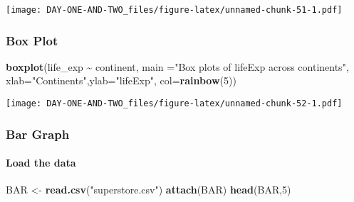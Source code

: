 \documentclass[
]{article}
\newenvironment{Shaded}{\begin{snugshade}}{\end{snugshade}}
\newcommand{\AttributeTok}[1]{\textcolor[rgb]{0.13,0.29,0.53}{#1}}
\newcommand{\DecValTok}[1]{\textcolor[rgb]{0.00,0.00,0.81}{#1}}
\newcommand{\FunctionTok}[1]{\textcolor[rgb]{0.13,0.29,0.53}{\textbf{#1}}}
\newcommand{\NormalTok}[1]{#1}
\newcommand{\OtherTok}[1]{\textcolor[rgb]{0.56,0.35,0.01}{#1}}
\newcommand{\SpecialCharTok}[1]{\textcolor[rgb]{0.81,0.36,0.00}{\textbf{#1}}}
\newcommand{\StringTok}[1]{\textcolor[rgb]{0.31,0.60,0.02}{#1}}
\begin{document}
\texttt{[image: DAY-ONE-AND-TWO\_files/figure-latex/unnamed-chunk-51-1.pdf]}

\hypertarget{box-plot}{%
\subsubsection{Box Plot}\label{box-plot}}

\begin{Shaded}
\begin{Highlighting}[]
\FunctionTok{boxplot}\NormalTok{(life\_exp }\SpecialCharTok{\textasciitilde{}}\NormalTok{ continent, }\AttributeTok{main =}\StringTok{"Box plots of lifeExp across continents"}\NormalTok{,}
        \AttributeTok{xlab=}\StringTok{"Continents"}\NormalTok{,}\AttributeTok{ylab=}\StringTok{"lifeExp"}\NormalTok{,}
        \AttributeTok{col=}\FunctionTok{rainbow}\NormalTok{(}\DecValTok{5}\NormalTok{))}
\end{Highlighting}
\end{Shaded}

\texttt{[image: DAY-ONE-AND-TWO\_files/figure-latex/unnamed-chunk-52-1.pdf]}

\hypertarget{bar-graph}{%
\subsubsection{Bar Graph}\label{bar-graph}}

\hypertarget{load-the-data}{%
\paragraph{Load the data}\label{load-the-data}}

\begin{Shaded}
\begin{Highlighting}[]
\NormalTok{BAR }\OtherTok{\textless{}{-}} \FunctionTok{read.csv}\NormalTok{(}\StringTok{"superstore.csv"}\NormalTok{)}
\FunctionTok{attach}\NormalTok{(BAR)}
\FunctionTok{head}\NormalTok{(BAR,}\DecValTok{5}\NormalTok{)}
\end{Highlighting}
\end{Shaded}
\end{document}
